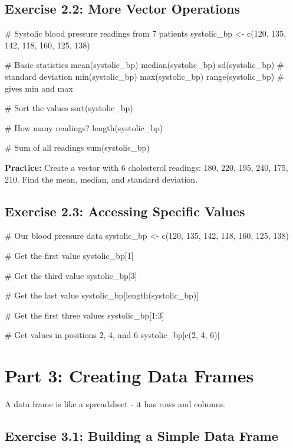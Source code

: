 \documentclass[11pt]{article}
\begin{document}
\subsection{Exercise 2.2: More Vector Operations}

\begin{rcode}
# Systolic blood pressure readings from 7 patients
systolic_bp <- c(120, 135, 142, 118, 160, 125, 138)

# Basic statistics
mean(systolic_bp)
median(systolic_bp)
sd(systolic_bp)  # standard deviation
min(systolic_bp)
max(systolic_bp)
range(systolic_bp)  # gives min and max

# Sort the values
sort(systolic_bp)

# How many readings?
length(systolic_bp)

# Sum of all readings
sum(systolic_bp)
\end{rcode}

\textbf{Practice:} Create a vector with 6 cholesterol readings: 180, 220, 195, 240, 175, 210. Find the mean, median, and standard deviation.

\vspace{2cm}

\subsection{Exercise 2.3: Accessing Specific Values}

\begin{rcode}
# Our blood pressure data
systolic_bp <- c(120, 135, 142, 118, 160, 125, 138)

# Get the first value
systolic_bp[1]

# Get the third value
systolic_bp[3]

# Get the last value
systolic_bp[length(systolic_bp)]

# Get the first three values
systolic_bp[1:3]

# Get values in positions 2, 4, and 6
systolic_bp[c(2, 4, 6)]
\end{rcode}

\section{Part 3: Creating Data Frames}

A data frame is like a spreadsheet - it has rows and columns.

\subsection{Exercise 3.1: Building a Simple Data Frame}
\end{document}
